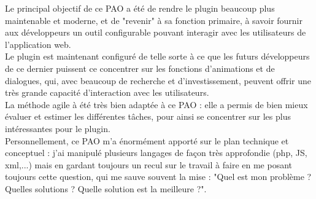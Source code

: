 \documentclass[11pt,dvipsnames,svgnames]{report}
\begin{document}
	Le principal objectif de ce PAO a été de rendre le plugin beaucoup plus maintenable et moderne, et de "revenir" à sa fonction primaire, à savoir fournir aux développeurs un outil configurable pouvant interagir avec les utilisateurs de l'application web. \\
	
	Le plugin est maintenant configuré de telle sorte à ce que les futurs développeurs de ce dernier puissent ce concentrer sur les fonctions d'animations et de dialogues, qui, avec beaucoup de recherche et d'investissement, peuvent offrir une très grande capacité d'interaction avec les utilisateurs.\\
	
	La méthode agile à été très bien adaptée à ce PAO : elle a permis de bien mieux évaluer et estimer les différentes tâches, pour ainsi se concentrer sur les plus intéressantes pour le plugin.\\
	
	Personnellement, ce PAO m'a énormément apporté sur le plan technique et conceptuel : j'ai manipulé plusieurs langages de façon très approfondie (php, JS, xml,...) mais en gardant toujours un recul sur le travail à faire en me posant toujours cette question, qui me sauve souvent la mise : "Quel est mon problème ? Quelles solutions ? Quelle solution est la meilleure ?".
\end{document}
